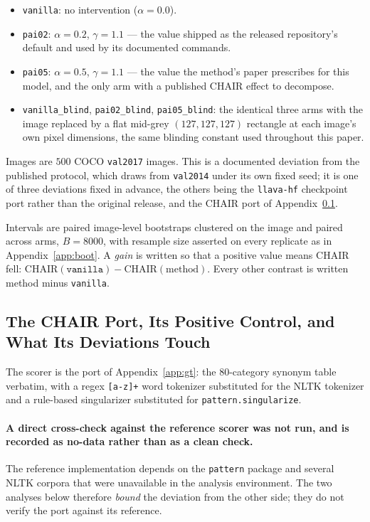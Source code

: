 \begin{itemize}
\itemsep0em
\item \texttt{vanilla}: no intervention ($\alpha = 0.0$).
\item \texttt{pai02}: $\alpha = 0.2$, $\gamma = 1.1$ --- the value shipped as the released
repository's default and used by its documented commands.
\item \texttt{pai05}: $\alpha = 0.5$, $\gamma = 1.1$ --- the value the method's paper prescribes for
this model, and the only arm with a published CHAIR effect to decompose.
\item \texttt{vanilla\_blind}, \texttt{pai02\_blind}, \texttt{pai05\_blind}: the identical three arms
with the image replaced by a flat mid-grey $(127,127,127)$ rectangle at each image's own pixel
dimensions, the same blinding constant used throughout this paper.
\end{itemize}

Images are $500$ COCO \texttt{val2017} images. This is a documented deviation from the published
protocol, which draws from \texttt{val2014} under its own fixed seed; it is one of three deviations
fixed in advance, the others being the \texttt{llava-hf} checkpoint port rather than the original
release, and the CHAIR port of Appendix~\ref{app:mitig-port}.

Intervals are paired image-level bootstraps clustered on the image and paired across arms,
$B = 8000$, with resample size asserted on every replicate as in Appendix~\ref{app:boot}. A
\emph{gain} is written so that a positive value means CHAIR fell: $\mathrm{CHAIR}(\texttt{vanilla})
- \mathrm{CHAIR}(\text{method})$. Every other contrast is written method minus \texttt{vanilla}.

\subsection{The CHAIR Port, Its Positive Control, and What Its Deviations Touch}
\label{app:mitig-port}

The scorer is the port of Appendix~\ref{app:gt}: the $80$-category synonym table verbatim, with a
regex \texttt{[a-z]+} word tokenizer substituted for the NLTK tokenizer and a rule-based
singularizer substituted for \texttt{pattern.singularize}.

\paragraph{A direct cross-check against the reference scorer was not run, and is recorded as no-data
rather than as a clean check.} The reference implementation depends on the \texttt{pattern} package and
several NLTK corpora that were unavailable in the analysis environment. The two analyses
below therefore \emph{bound} the deviation from the other side; they do not verify the port against
its reference.

